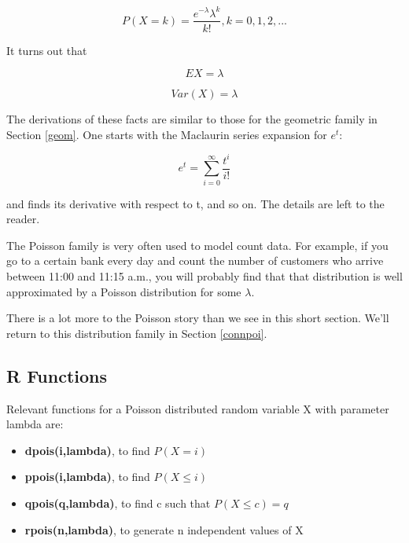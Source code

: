 \begin{equation}
\label{poispmf}
P(X = k) = \frac{e^{- \lambda} \lambda^k}{k!}, k = 0,1,2,...
\end{equation}

It turns out that

\begin{equation}
EX = \lambda
\end{equation}

\begin{equation}
Var(X) = \lambda
\end{equation}

The derivations of these facts are similar to those for the geometric
family in Section \ref{geom}.  One starts with the Maclaurin series
expansion for $e^t$:

\begin{equation}
e^t = \sum_{i=0}^{\infty} \frac{t^i}{i!}
\end{equation}

and finds its derivative with respect to t, and so on.  The details are
left to the reader.

\label{bankex}
The Poisson family is very often used to model count data.  For example,
if you go to a certain bank every day and count the number of customers
who arrive between 11:00 and 11:15 a.m., you will probably find that that
distribution is well approximated by a Poisson distribution for some
$\lambda$.

There is a lot more to the Poisson story than we see in this short
section.  We'll return to this distribution family in Section
\ref{connpoi}. 

\subsection{R Functions}

Relevant functions for a Poisson distributed random variable X
with parameter lambda are:

\begin{itemize}

\item {\bf dpois(i,lambda)}, to find $P(X = i)$

\item {\bf ppois(i,lambda)}, to find $P(X \leq i)$

\item {\bf qpois(q,lambda)}, to find c such that $P(X \leq c) = q$

\item {\bf rpois(n,lambda)}, to generate n independent values of X

\end{itemize}

